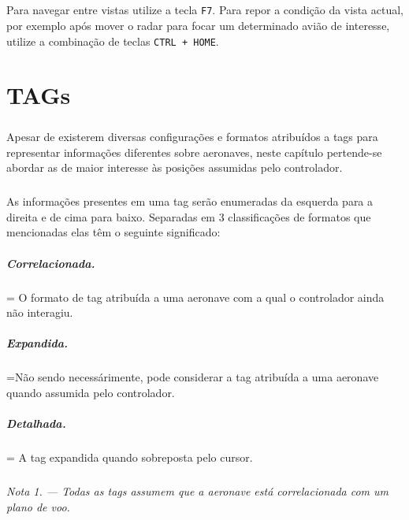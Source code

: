 \documentclass[10pt]{report}
\begin{document}
\paragraph{} Para navegar entre vistas utilize a tecla \texttt{F7}. Para repor a condição da vista
actual, por exemplo após mover o radar para focar um determinado avião de interesse, utilize a
combinação de teclas \texttt{CTRL + HOME}.

\chapter{TAGs}
\label{cap:tags}

\paragraph{} Apesar de existerem diversas configurações e formatos atribuídos a tags para
representar informações diferentes sobre aeronaves, neste capítulo pertende-se abordar as de maior
interesse às posições assumidas pelo controlador.

\paragraph{} As informações presentes em uma tag serão enumeradas da esquerda para a direita e de
cima para baixo. Separadas em 3 classificações de formatos que mencionadas elas têm o seguinte
significado:

\paragraph*{\textit{Correlacionada.}}
\hangindent=\parindent
O formato de tag atribuída a uma aeronave com a qual o controlador ainda não interagiu.

\paragraph*{\textit{Expandida.}}
\hangindent=\parindent Não sendo necessárimente, pode considerar a tag atribuída a uma aeronave
quando assumida pelo controlador.

\paragraph*{\textit{Detalhada.}}
\hangindent=\parindent
A tag expandida quando sobreposta pelo cursor.

\paragraph*{}
\textit{Nota 1. — Todas as tags assumem que a aeronave está correlacionada com um plano de voo.}
\end{document}
